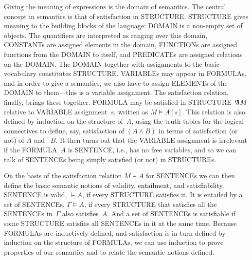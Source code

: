 \documentclass[10pt,a4paper]{article}
\newcommand*{\olup}[1]{\MakeUppercase{#1}}
\theoremstyle{plain}
\theoremstyle{definition}
\theoremstyle{remark}
\newcommand*{\olfileid}[3]{}
\providecommand{\Entails}{\mathrel{\models}}
\providecommand{\Struct}{\ensuremath{\mathfrak{A}}}
\providecommand{\Sat}[2]{\ensuremath{#1 \models #2}}
\begin{document}
Giving the meaning of expressions is the domain of semantics.  The
central concept in semantics is that of satisfaction in
\olup{structure}. \olup{structure} gives meaning to the building blocks
of the language: \olup{domain} is a non-empty set of objects. The
quantifiers are interpreted as ranging over this domain, \olup{constant}s
are assigned elements in the domain, \olup{function}s are assigned
functions from the \olup{domain} to itself, and \olup{predicate}s are
assigned relations on the \olup{domain}.  The \olup{domain} together with
assignments to the basic vocabulary constitutes \olup{structure}.
\olup{variable}s may appear in \olup{formula}s, and in order to give a
semantics, we also have to assign \olup{element}s of the \olup{domain} to
them---this is a variable assignment. The satisfaction relation,
finally, brings these together. \olup{formula} may be satisfied in
\olup{structure}~$\Struct{M}$ relative to \olup{variable} assignment~$s$,
written as $\Sat{M}{A}[s]$. This relation is also defined by
induction on the structure of~$A$, using the truth tables for the
logical connectives to define, say, satisfaction of $(A \land B)$ in
terms of satisfaction (or not) of $A$ and ~$B$.  It then turns out
that the \olup{variable} assignment is irrelevant if the \olup{formula}~$A$
is \olup{sentence}, i.e., has no free variables, and so we can talk of
\olup{sentence}s being simply satisfied (or not) in \olup{structure}s.

On the basis of the satisfaction relation $\Sat{M}{A}$ for \olup{sentence}s
we can then define the basic semantic notions of validity, entailment,
and satisfiability. \olup{sentence} is valid, $\Entails A$, if every
\olup{structure} satisfies it. It is entailed by a set of \olup{sentence}s,
$\Gamma \Entails A$, if every \olup{structure} that satisfies all the
\olup{sentence}s in~$\Gamma$ also satisfies~$A$. And a set of \olup{sentence}s
is satisfiable if some \olup{structure} satisfies all \olup{sentence}s in it
at the same time.  Because \olup{formula}s are inductively defined, and
satisfaction is in turn defined by induction on the structure of
\olup{formula}s, we can use induction to prove properties of our
semantics and to relate the semantic notions defined.





\olfileid{fol}{syn}{itx}
\end{document}
